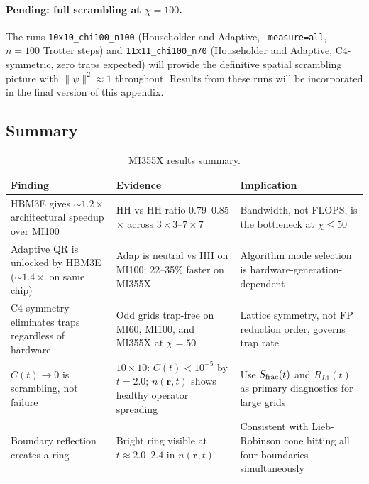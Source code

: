 \paragraph{Pending: full scrambling at $\chi=100$.}
The runs \texttt{10x10\_chi100\_n100} (Householder and Adaptive,
\texttt{--measure=all}, $n=100$ Trotter steps) and
\texttt{11x11\_chi100\_n70} (Householder and Adaptive, C4-symmetric,
zero traps expected) will provide the definitive spatial scrambling picture
with $\|\psi\|^2 \approx 1$ throughout.
Results from these runs will be incorporated in the final version of this
appendix.

\subsection*{Summary}

\begin{table}[ht]
\centering
\caption{MI355X results summary.}
\label{tab:mi355x_summary}
\smallskip
\small
\begin{tabular}{p{3.8cm} p{4.0cm} p{4.4cm}}
\toprule
\textbf{Finding} & \textbf{Evidence} & \textbf{Implication} \\
\midrule
HBM3E gives ${\sim}1.2\times$ architectural speedup over MI100
  & HH-vs-HH ratio 0.79--0.85$\times$ across $3\times3$--$7\times7$
  & Bandwidth, not FLOPS, is the bottleneck at $\chi \leq 50$ \\[4pt]

Adaptive QR is unlocked by HBM3E (${\sim}1.4\times$ on same chip)
  & Adap is neutral vs HH on MI100; 22--35\% faster on MI355X
  & Algorithm mode selection is hardware-generation-dependent \\[4pt]

C4 symmetry eliminates traps regardless of hardware
  & Odd grids trap-free on MI60, MI100, and MI355X at $\chi=50$
  & Lattice symmetry, not FP reduction order, governs trap rate \\[4pt]

$C(t)\to 0$ is scrambling, not failure
  & $10\times10$: $C(t) < 10^{-5}$ by $t=2.0$; $n(\mathbf{r},t)$ shows
    healthy operator spreading
  & Use $S_{\rm frac}(t)$ and $R_{L1}(t)$ as primary diagnostics for large grids \\[4pt]

Boundary reflection creates a ring
  & Bright ring visible at $t \approx 2.0$--$2.4$ in $n(\mathbf{r},t)$
  & Consistent with Lieb-Robinson cone hitting all four boundaries simultaneously \\
\bottomrule
\end{tabular}
\end{table}
